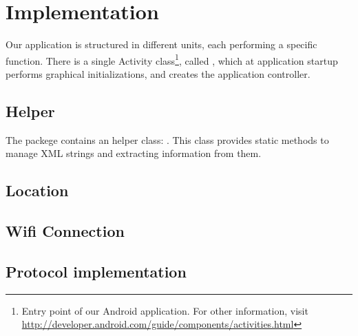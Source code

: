 \section{Implementation}
\label{sec:implementation}

Our application is structured in different units, each performing a specific function. There is a single Activity class\footnote{Entry point of our Android application. For other information, visit \url{http://developer.android.com/guide/components/activities.html}}, called , which at application startup performs graphical initializations, and creates the application controller. 

\subsection{Helper}
The packege  contains an helper class: . This class provides static methods to manage XML strings and extracting information from them.
\subsection{Location}
\subsection{Wifi Connection}
\subsection{Protocol implementation}

